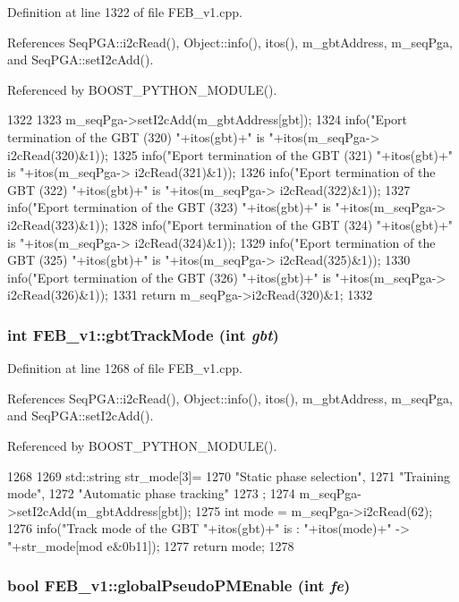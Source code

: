 Definition at line 1322 of file FEB\_\-v1.cpp.

References SeqPGA::i2cRead(), Object::info(), itos(), m\_\-gbtAddress, m\_\-seqPga, and SeqPGA::setI2cAdd().

Referenced by BOOST\_\-PYTHON\_\-MODULE().


\begin{DoxyCode}
1322                                   {
1323   m_seqPga->setI2cAdd(m_gbtAddress[gbt]);
1324   info("Eport termination of the GBT (320) "+itos(gbt)+" is "+itos(m_seqPga->
      i2cRead(320)&1));
1325   info("Eport termination of the GBT (321) "+itos(gbt)+" is "+itos(m_seqPga->
      i2cRead(321)&1));
1326   info("Eport termination of the GBT (322) "+itos(gbt)+" is "+itos(m_seqPga->
      i2cRead(322)&1));
1327   info("Eport termination of the GBT (323) "+itos(gbt)+" is "+itos(m_seqPga->
      i2cRead(323)&1));
1328   info("Eport termination of the GBT (324) "+itos(gbt)+" is "+itos(m_seqPga->
      i2cRead(324)&1));
1329   info("Eport termination of the GBT (325) "+itos(gbt)+" is "+itos(m_seqPga->
      i2cRead(325)&1));
1330   info("Eport termination of the GBT (326) "+itos(gbt)+" is "+itos(m_seqPga->
      i2cRead(326)&1));
1331   return m_seqPga->i2cRead(320)&1;
1332 }
\end{DoxyCode}
\hypertarget{classFEB__v1_a25eeb132e9058cd421a085878fba9204}{
\subsubsection[{gbtTrackMode}]{\setlength{\rightskip}{0pt plus 5cm}int FEB\_\-v1::gbtTrackMode (int {\em gbt})}}
\label{classFEB__v1_a25eeb132e9058cd421a085878fba9204}


Definition at line 1268 of file FEB\_\-v1.cpp.

References SeqPGA::i2cRead(), Object::info(), itos(), m\_\-gbtAddress, m\_\-seqPga, and SeqPGA::setI2cAdd().

Referenced by BOOST\_\-PYTHON\_\-MODULE().


\begin{DoxyCode}
1268                                  {
1269   std::string str_mode[3]={
1270     "Static phase selection",
1271     "Training mode",
1272     "Automatic phase tracking"
1273   };
1274   m_seqPga->setI2cAdd(m_gbtAddress[gbt]);
1275   int mode = m_seqPga->i2cRead(62);
1276   info("Track mode of the GBT "+itos(gbt)+" is : "+itos(mode)+" -> "+str_mode[mod
      e&0b11]); 
1277   return mode; 
1278 }
\end{DoxyCode}
\hypertarget{classFEB__v1_acfaf998ce0166362401e5253502a16d2}{
\subsubsection[{globalPseudoPMEnable}]{\setlength{\rightskip}{0pt plus 5cm}bool FEB\_\-v1::globalPseudoPMEnable (int {\em fe})}}
\label{classFEB__v1_acfaf998ce0166362401e5253502a16d2}


